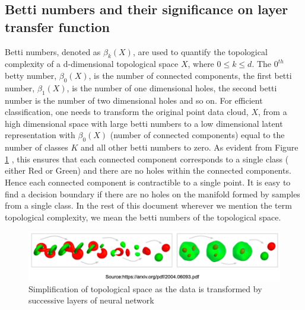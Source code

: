 \documentclass{bmvc2k}
\begin{document}
\subsection{Betti numbers and their significance on  layer transfer function}
Betti numbers, denoted as $\beta_k(X)$,   are used to quantify the topological complexity of a d-dimensional topological space  $X$, where  $0 \leq k \leq d$.
The  $0^{th}$ betty number, $\beta_0(X)$, is the number of connected components, the first betti number, $\beta_1(X)$, is the number of one dimensional holes, the second betti number is the number of two dimensional holes and so on.
For efficient classification, one needs to transform the original point data cloud, $X$,  from a high dimensional space with large betti numbers to a low dimensional latent representation with  $\beta_0(X)$ (number of connected components) equal to the number of classes $K$ and all other betti numbers to zero.
As evident from Figure \ref{figure6} , this ensures that each connected component  corresponds to a single class ( either Red or Green) and there are no holes within the connected components.
Hence  each connected component is contractible  to a single point.
It is easy to find a decision boundary if there are no holes on the manifold formed by samples from a  single class.
In the rest of this document wherever we mention the term  topological complexity, we mean the betti numbers of the topological space.


\begin{figure}
    \centering
    \includegraphics[width=.7\linewidth]{images/figure6.png}
\vspace{.1in}
    \caption{Simplification of topological space as the data is transformed by successive layers of neural network}
    \label{figure6}
    \end{figure}
\end{document}
